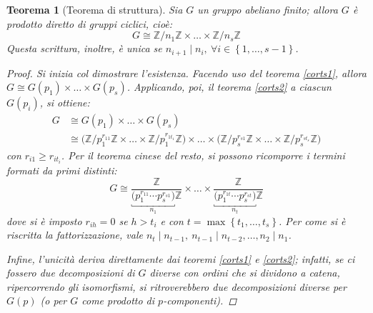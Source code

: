 \documentclass[11pt]{scrartcl}
\theoremstyle{style1}
\newtheorem{teorema}{Teorema}[section]
\numberwithin{equation}{subsection}
\begin{document}
\begin{teorema}
	[Teorema di struttura]
	Sia $G$ un gruppo abeliano finito; allora $G$ \`e prodotto diretto di gruppi ciclici, cio\`e:
	\[
	G \cong \mathbb{Z}/n_1\mathbb{Z} \times  \ldots \times \mathbb{Z} / n_s \mathbb{Z}
	\] 
	Questa scrittura, inoltre, \`e unica se $n_{i+1}  \mid n_i, \ \forall i \in \left\{ 1, \ldots, s-1 \right\} $.
	\begin{proof}
		Si inizia col dimostrare l'esistenza. 
		Facendo uso del teorema \ref{corts1}, allora $G \cong G(p_1) \times \ldots \times G(p_s)$. 
		Applicando, poi, il teorema \ref{corts2} a ciascun $G(p_i)$, si ottiene:
		\[
			\begin{split}
				G &\cong G(p_1) \times  \ldots \times G(p_s) \\
				  &\cong \Big(\mathbb{Z}/p_1^{r_{11} }\mathbb{Z} \times \ldots \times \mathbb{Z}/ p_1^{r_{1t_1} }\mathbb{Z}\Big) \times  \ldots \times \Big(\mathbb{Z}/ p_s^{r_{s1} }\mathbb{Z}\times  \ldots\times \mathbb{Z}/p_s^{r_{st_s} }\mathbb{Z}  \Big) 
			\end{split}
		\] 
		con $r_{i 1} \ge r_{i t_i} $. 
		Per il teorema cinese del resto, si possono ricomporre i termini formati da primi distinti:
		\[
			G\cong \frac{\mathbb{Z}}{\underbracket{\big(p_1^{r_{11}} \cdots p_s^{r_{s 1} } \big)}_{n_1} \mathbb{Z}} \times  \ldots \times \frac{\mathbb{Z}}{ \underbracket{\big(p_1^{r_{1t} }\cdots p_s^{r_{st} } \big)}_{n_t} \mathbb{Z}}
		\] 
	dove si \`e imposto $r_{ih} =0$ se $h>t_i$ e con $t = \max \left\{ t_1,\ldots,t_s \right\} $.
	Per come si \`e riscritta la fattorizzazione, vale $n_t  \mid  n_{t-1} , \ n_{t-1}  \mid n_{t-2} , \ldots, n_2 \mid n_1$.

	Infine, l'unicit\`a deriva direttamente dai teoremi \ref{corts1} e \ref{corts2}; infatti, se ci fossero due decomposizioni di $G$ diverse con ordini che si dividono a catena, ripercorrendo gli isomorfismi, si ritroverebbero due decomposizioni diverse per $G(p)$ (o per $G$ come prodotto di $p$-componenti).
	\end{proof}
\end{teorema}
\end{document}
